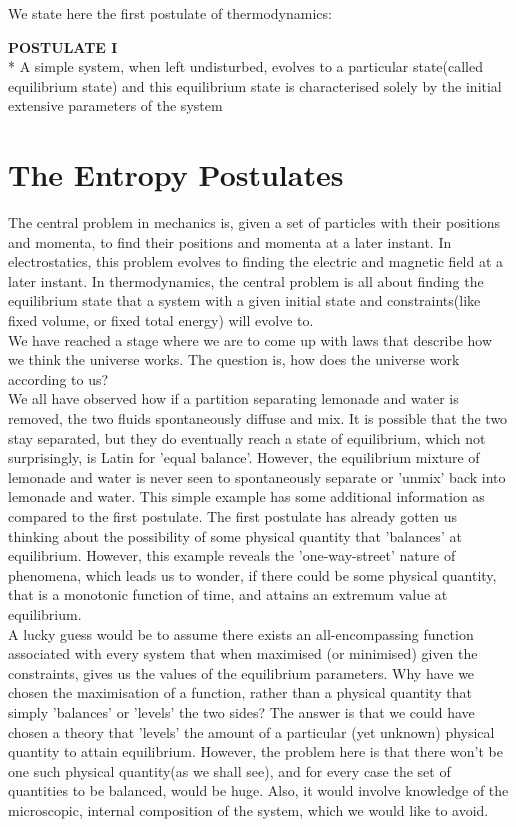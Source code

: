 \documentclass[oneside]{book}
\begin{document}
We state here the first postulate of thermodynamics:\\
\begin{mdframed}[style=exercise]
\textbf{POSTULATE I}
\\* A simple system, when left undisturbed, evolves to a particular state(called equilibrium state) and this equilibrium state is characterised solely by the initial extensive parameters of the system\\ 
\end{mdframed}


\section{The Entropy Postulates}
The central problem in mechanics is, given a set of particles with their positions and momenta, to find their positions and momenta at a later instant. In electrostatics, this problem evolves to finding the electric and magnetic field at a later instant. In thermodynamics, the central problem is all about finding the equilibrium state that a system with a given initial state and constraints(like fixed volume, or fixed total energy) will evolve to.\\

We have reached a stage where we are to come up with laws that describe how we think the universe works. The question is, how does the universe work according to us?\\

We all have observed how if a partition separating lemonade and water is removed, the two fluids spontaneously diffuse and mix. It is possible that the two stay separated, but they do eventually reach a state of equilibrium, which not surprisingly, is Latin for 'equal balance'. However, the equilibrium mixture of lemonade and water is never seen to spontaneously separate or 'unmix' back into lemonade and water. This simple example has some additional information as compared to the first postulate. The first postulate has already gotten us thinking about the possibility of some physical quantity that 'balances' at equilibrium. However, this example reveals the 'one-way-street' nature of phenomena, which leads us to wonder, if there could be some physical quantity, that is a monotonic function of time, and attains an extremum value at equilibrium.\\

A lucky guess would be to assume there exists an all-encompassing function associated with every system that when maximised (or minimised) given the constraints, gives us the values of the equilibrium parameters. Why have we chosen the maximisation of a function, rather than a physical quantity that simply 'balances' or 'levels' the two sides? The answer is that we could have chosen a theory that 'levels' the amount of a particular (yet unknown) physical quantity to attain equilibrium. However, the problem here is that there won't be one such physical quantity(as we shall see), and for every case the set of quantities to be balanced, would be huge. Also, it would involve knowledge of the microscopic, internal composition of the system, which we would like to avoid.\\
\end{document}
